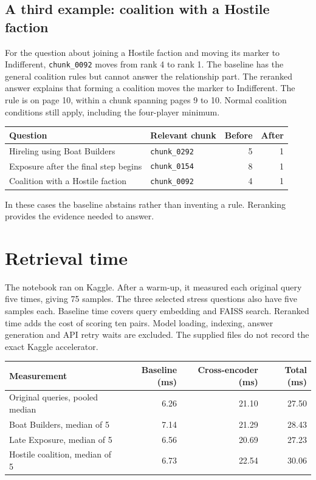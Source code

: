 \documentclass[11pt,a4paper]{article}
\begin{document}
\subsection*{A third example: coalition with a Hostile faction}

For the question about joining a Hostile faction and moving its marker to
Indifferent, \texttt{chunk\_0092} moves from rank 4 to rank 1. The baseline
has the general coalition rules but cannot answer the relationship part.
The reranked answer explains that forming a coalition moves the marker to
Indifferent. The rule is on page 10, within a chunk spanning pages 9 to 10.
Normal coalition conditions still apply, including the four-player minimum.

\begin{center}
\small
\begin{tabular}{p{}p{}rr}
\hline
Question & Relevant chunk & Before & After \\
\hline
Hireling using Boat Builders & \texttt{chunk\_0292} & 5 & 1 \\
Exposure after the final step begins & \texttt{chunk\_0154} & 8 & 1 \\
Coalition with a Hostile faction & \texttt{chunk\_0092} & 4 & 1 \\
\hline
\end{tabular}
\end{center}

In these cases the baseline abstains rather than inventing a rule.
Reranking provides the evidence needed to answer.

\section{Retrieval time}

The notebook ran on Kaggle. After a warm-up, it measured each original
query five times, giving 75 samples. The three selected stress questions
also have five samples each. Baseline time covers query embedding and
FAISS search. Reranked time adds the cost of scoring ten pairs.
Model loading, indexing, answer generation and API retry waits are excluded.
The supplied files do not record the exact Kaggle accelerator.

\begin{center}
\small
\begin{tabular}{p{}rrr}
\hline
Measurement & Baseline (ms) & Cross-encoder (ms) & Total (ms) \\
\hline
Original queries, pooled median & 6.26 & 21.10 & 27.50 \\
Boat Builders, median of 5 & 7.14 & 21.29 & 28.43 \\
Late Exposure, median of 5 & 6.56 & 20.69 & 27.23 \\
Hostile coalition, median of 5 & 6.73 & 22.54 & 30.06 \\
\hline
\end{tabular}
\end{center}
\end{document}
